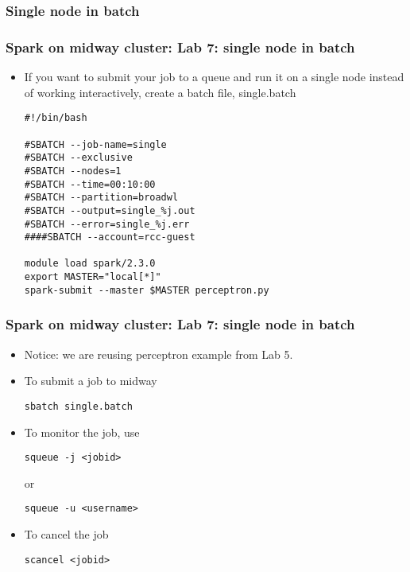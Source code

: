 \documentclass{beamer}
\begin{document}
\begin{frame}[fragile]
\begin{itemize}
\subsubsection{Single node in batch}
\begin{frame}[fragile]
  \frametitle{Spark on midway cluster: Lab 7: single node in batch}
  \begin{itemize}
  \item If you want to submit your job to a queue and run it on a single node instead of working interactively, create a batch file, {\color{mycolorcli}single.batch}
    {\color{mycolorcli}
\begin{verbatim}
#!/bin/bash

#SBATCH --job-name=single
#SBATCH --exclusive
#SBATCH --nodes=1
#SBATCH --time=00:10:00
#SBATCH --partition=broadwl
#SBATCH --output=single_%j.out
#SBATCH --error=single_%j.err
####SBATCH --account=rcc-guest

module load spark/2.3.0
export MASTER="local[*]"
spark-submit --master $MASTER perceptron.py
\end{verbatim}
    }
  \end{itemize}
\end{frame}

\begin{frame}[fragile]
  \frametitle{Spark on midway cluster: Lab 7: single node in batch}
  \begin{itemize}
  \item Notice: we are reusing perceptron example from Lab 5.
  \item To submit a job to midway
    {\color{mycolorcli}
\begin{verbatim}
sbatch single.batch
\end{verbatim}
    }
  \item To monitor the job, use
    {\color{mycolorcli}
\begin{verbatim}
squeue -j <jobid>
\end{verbatim}
    }
    or
    {\color{mycolorcli}
\begin{verbatim}
squeue -u <username>
\end{verbatim}
    }
  \item To cancel the job
    {\color{mycolorcli}
\begin{verbatim}
scancel <jobid>
\end{verbatim}
    }
  \end{itemize}
\end{frame}



\end{itemize}
\end{frame}
\end{document}
